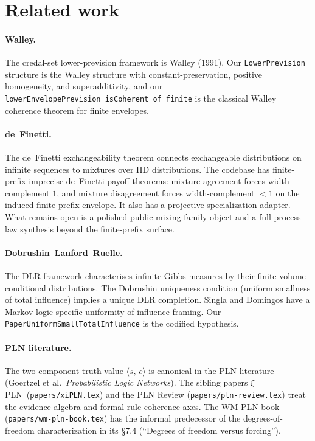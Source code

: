 \documentclass[]{article}
\newcommand{\xiPLN}{\texorpdfstring{$\xi$}{xi}\textup{PLN}}
\newcommand{\lid}[1]{{\ttfamily\nolinkurl{#1}}}
\newcommand{\lpath}[1]{\texttt{\nolinkurl{#1}}}
\newcommand{\STV}[2]{\langle #1,\, #2 \rangle}
\begin{document}
\section{Related work}\label{sec:related}

\paragraph{Walley.}
The credal-set lower-prevision framework is Walley (1991). Our
\lid{LowerPrevision} structure is the Walley structure with
constant-preservation, positive homogeneity, and superadditivity, and
our \lid{lowerEnvelopePrevision\_isCoherent\_of\_finite} is the
classical Walley coherence theorem for finite envelopes.

\paragraph{de~Finetti.}
The de~Finetti exchangeability theorem connects exchangeable distributions
on infinite sequences to mixtures over IID distributions. The codebase has
finite-prefix imprecise de~Finetti payoff theorems: mixture agreement
forces width-complement $1$, and mixture disagreement forces
width-complement $<1$ on the induced finite-prefix envelope. It also has a
projective specialization adapter. What remains open is a polished public
mixing-family object and a full process-law synthesis beyond the
finite-prefix surface.

\paragraph{Dobrushin--Lanford--Ruelle.}
The DLR framework characterises infinite Gibbs measures by their
finite-volume conditional distributions. The Dobrushin uniqueness
condition (uniform smallness of total influence) implies a unique DLR
completion. Singla and Domingos have a Markov-logic specific
uniformity-of-influence framing. Our \lid{PaperUniformSmallTotalInfluence}
is the codified hypothesis.

\paragraph{PLN literature.}
The two-component truth value $\STV{s}{c}$ is canonical in the PLN
literature (Goertzel et al.\ \emph{Probabilistic Logic Networks}). The
sibling papers \xiPLN\ (\lpath{papers/xiPLN.tex}) and the PLN Review
(\lpath{papers/pln-review.tex}) treat the evidence-algebra and
formal-rule-coherence axes. The WM-PLN book
(\lpath{papers/wm-pln-book.tex}) has the informal predecessor of the
degrees-of-freedom characterization in its \S 7.4
(``Degrees of freedom versus forcing'').
\end{document}
